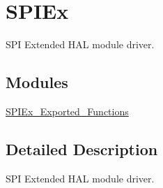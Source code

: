 \hypertarget{group___s_p_i_ex}{}\section{S\+P\+I\+Ex}
\label{group___s_p_i_ex}


S\+PI Extended H\+AL module driver.  


\subsection*{Modules}
\begin{DoxyCompactItemize}
\item 
\hyperlink{group___s_p_i_ex___exported___functions}{S\+P\+I\+Ex\+\_\+\+Exported\+\_\+\+Functions}
\end{DoxyCompactItemize}


\subsection{Detailed Description}
S\+PI Extended H\+AL module driver. 

